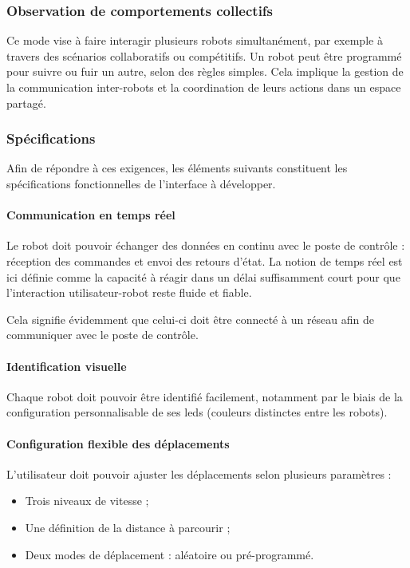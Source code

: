 \subsubsection{Observation de comportements collectifs}
Ce mode vise à faire interagir plusieurs robots simultanément, par exemple à travers des scénarios collaboratifs ou compétitifs.
Un robot peut être programmé pour suivre ou fuir un autre, selon des règles simples.
Cela implique la gestion de la communication inter-robots et la coordination de leurs actions dans un espace partagé.


\subsubsection{Spécifications}
Afin de répondre à ces exigences, les éléments suivants constituent les spécifications fonctionnelles de l’interface à développer.

\paragraph{Communication en temps réel} 
Le robot doit pouvoir échanger des données en continu avec le poste de contrôle : réception des commandes et envoi des retours d’état.  
La notion de temps réel est ici définie comme la capacité à réagir dans un délai suffisamment court pour que l’interaction utilisateur-robot reste fluide et fiable.

Cela signifie évidemment que celui-ci doit être connecté à un réseau afin de communiquer avec le poste de contrôle.

\paragraph{Identification visuelle}
Chaque robot doit pouvoir être identifié facilement, notamment par le biais de la configuration personnalisable de ses \acrshort{led}s (couleurs distinctes entre les robots).

\paragraph{Configuration flexible des déplacements}
L’utilisateur doit pouvoir ajuster les déplacements selon plusieurs paramètres :
\begin{itemize}
    \item Trois niveaux de vitesse ;
    \item Une définition de la distance à parcourir ;
    \item Deux modes de déplacement : aléatoire ou pré-programmé.
\end{itemize}

